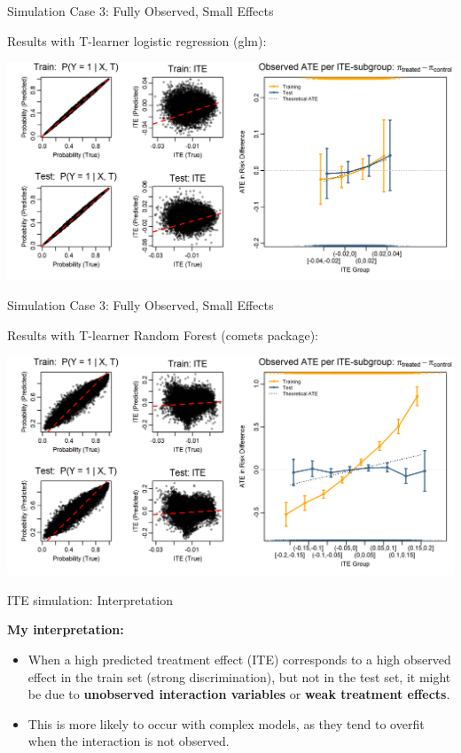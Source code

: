 \documentclass[onlytextwidth,english]{beamer}\usepackage[]{graphicx}\usepackage[]{xcolor}
\begin{document}
\begin{frame}{Simulation Case 3: Fully Observed, Small Effects}

Results with T-learner logistic regression (glm):

\includegraphics[width=\textwidth]{img/small_interaction_glm_tlearner.png}

\end{frame}


\begin{frame}{Simulation Case 3: Fully Observed, Small Effects}

Results with T-learner Random Forest (comets package):

\includegraphics[width=\textwidth]{img/small_interaction_tuned_rf_tlearner.png}

\end{frame}





\begin{frame}{ITE simulation: Interpretation}

\textbf{My interpretation:} 
\begin{itemize}
    \item When a high predicted treatment effect (ITE) corresponds to a high observed effect in the train set (strong discrimination), but not in the test set, it might be due to \textbf{unobserved interaction variables} or \textbf{weak treatment effects}.
    \item This is more likely to occur with complex models, as they tend to overfit when the interaction is not observed.
\end{itemize}


\end{frame}
\end{document}
